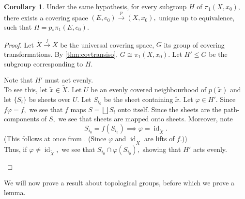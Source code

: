 \documentclass[12pt]{article}
\theoremstyle{definition}
\numberwithin{thm}{section}
\newtheorem{cor}[thm]{Corollary}
\newcommand{\id}{\operatorname{id}}
\newenvironment{blockquote}
{\begin{mdframed}[skipabove=0pt, skipbelow=0pt, innertopmargin=4pt, innerbottommargin=4pt, bottomline=false,topline=false,rightline=false, linewidth=2pt]}
{\end{mdframed}}
\begin{document}
\begin{cor}
	Under the same hypothesis, for every subgroup $H$ of $\pi_1(X, x_0),$ there exists a covering space $(E, e_0) \overset{p}{\longrightarrow} (X, x_0),$ unique up to equivalence, such that $H = p_*\pi_1(E, e_0).$
\end{cor}
\begin{proof} 
	Let $\tilde{X} \overset{f}{\longrightarrow} X$ be the universal covering space, $G$ its group of covering transformations. By \cref{thm:covtransiso}, $G \cong \pi_1(X, x_0).$ Let $H' \le G$ be the subgroup corresponding to $H.$ \\
	\begin{blockquote}
	Note that $H'$ must act evenly. \\
	To see this, let $\tilde{x} \in \tilde{X}.$ Let $U$ be an evenly covered neighbourhood of $p(\tilde{x})$ and let $\{S_i\}$ be sheets over $U.$ Let $S_{i_0}$ be the sheet containing $\tilde{x}.$ Let $\varphi \in H'.$ Since $f\varphi = f,$ we see that $f$ maps $S = \bigsqcup S_i$ onto itself. Since the sheets are the path-components of $S,$ we see that sheets are mapped onto sheets. Moreover, note
	\begin{equation*} 
		S_{i_0} = f(S_{i_0}) \implies \varphi = \id_{\tilde{X}}.
	\end{equation*}
	(This follows at once from . (Since $\varphi$ and $\id_{\tilde{X}}$ are lifts of $f$.))\\
	Thus, if $\varphi \neq \id_{\tilde{X}},$ we see that $S_{i_0} \cap \varphi(S_{i_0}),$ showing that $H'$ acts evenly.
	\end{blockquote}
\end{proof}

We will now prove a result about topological groups, before which we prove a lemma.
\end{document}
